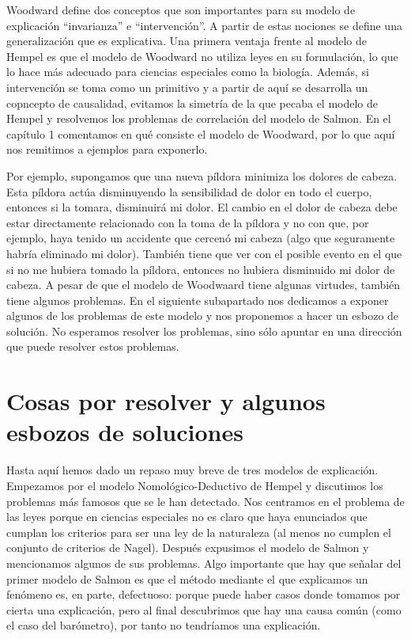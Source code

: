 Woodward define dos conceptos que son importantes para su modelo de explicación  ``invarianza'' e ``intervención''. A partir de estas nociones se define una generalización que es explicativa. Una primera ventaja frente al modelo de Hempel es que el modelo de Woodward no utiliza leyes en su formulación, lo que lo hace más adecuado para ciencias especiales como la biología. Además, si intervención se toma como un primitivo y a partir de aquí se desarrolla un copncepto de causalidad, evitamos la simetría de la que pecaba el modelo de Hempel y resolvemos los problemas de correlación del modelo de Salmon. En el capítulo 1 comentamos en qué consiste el modelo de Woodward, por lo que aquí nos remitimos a ejemplos para exponerlo.

Por ejemplo, supongamos que una nueva píldora minimiza los dolores de cabeza. Esta píldora actúa disminuyendo la sensibilidad de dolor en todo el cuerpo, entonces si la tomara, disminuirá mi dolor. El cambio en el dolor de cabeza debe estar directamente relacionado con la toma de la píldora y no con que, por ejemplo, haya tenido un accidente que cercenó mi cabeza (algo que seguramente habría eliminado mi dolor). También tiene que ver con el posible evento en el que si no me hubiera tomado la píldora, entonces no hubiera disminuido mi dolor de cabeza. A pesar de que el modelo de Woodwaard tiene algunas virtudes, también tiene algunos problemas. En el siguiente subapartado nos dedicamos a exponer algunos de los problemas de este modelo y nos proponemos a hacer un esbozo de solución. No esperamos resolver los problemas, sino sólo apuntar en una dirección que puede resolver estos problemas.


\section{Cosas por resolver y algunos esbozos de soluciones}

\noindent Hasta aquí hemos dado un repaso muy breve de tres modelos de explicación. Empezamos por el modelo Nomológico-Deductivo de Hempel y discutimos los problemas más famosos que se le han detectado. Nos centramos en el problema de las leyes porque en ciencias especiales no es claro que haya enunciados que cumplan los criterios para ser una ley de la naturaleza (al menos no cumplen el conjunto de criterios de Nagel). Después expusimos el modelo de Salmon y mencionamos algunos de sus problemas. Algo importante que hay que señalar del primer modelo de Salmon es que el método mediante el que explicamos un fenómeno es, en parte, defectuoso: porque puede haber casos donde tomamos por cierta una explicación, pero al final descubrimos que hay una causa común (como el caso del barómetro), por tanto no tendríamos una explicación.

